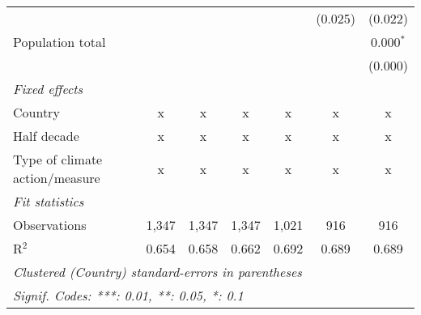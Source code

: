 \begin{tabular}{lcccccc}
                                                                                          &         &               &                &                & (0.025)        & (0.022)\\   
   Population total                                                                       &         &               &                &                &                & 0.000$^{*}$\\   
                                                                                          &         &               &                &                &                & (0.000)\\   
   \emph{Fixed effects}\\
   Country                                                                                & x       & x             & x              & x              & x              & x\\  
   Half decade                                                                            & x       & x             & x              & x              & x              & x\\  
   Type of climate action/measure                                                         & x       & x             & x              & x              & x              & x\\  
   \midrule \emph{Fit statistics}\\
   Observations                                                                           & 1,347   & 1,347         & 1,347          & 1,021          & 916            & 916\\  
   R$^2$                                                                                  & 0.654   & 0.658         & 0.662          & 0.692          & 0.689          & 0.689\\  
   \midrule
   \multicolumn{7}{l}{\emph{Clustered (Country) standard-errors in parentheses}}\\
   \multicolumn{7}{l}{\emph{Signif. Codes: ***: 0.01, **: 0.05, *: 0.1}}\\
\end{tabular}
\par\endgroup


